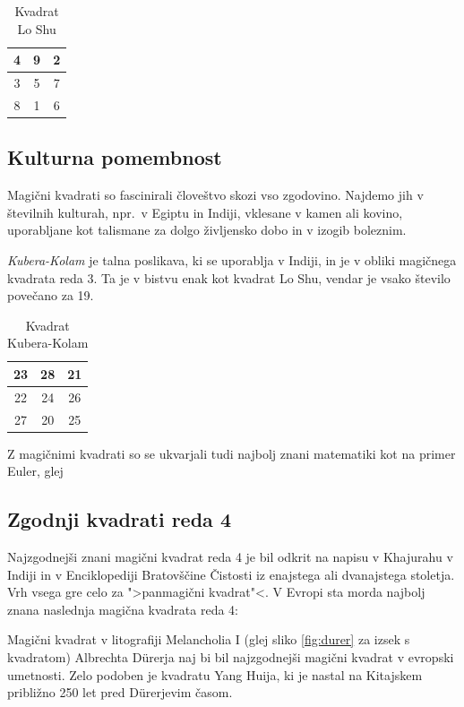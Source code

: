 \documentclass[a4paper,12pt]{article}
\newenvironment{magic}[3]{
   \begin{table}
      \centering
      \caption{#2}
      \label{#3}
      \Large
      \begin{tabular}{|*{#1}{c|}}\hline
}{
\end{tabular}
\end{table}
}
\begin{document}
 \begin{magic}{3}{Kvadrat Lo Shu}{table:loshu}
   4 & 9 & 2 \\\hline
   3 & 5 & 7 \\\hline
   8 & 1 & 6 \\\hline
 \end{magic}


\subsection{Kulturna pomembnost}

Magični kvadrati so fascinirali človeštvo skozi vso zgodovino. Najdemo jih
v številnih kulturah, npr.\ v Egiptu in Indiji, vklesane v kamen ali
kovino, uporabljane kot talismane za dolgo življensko dobo in v
izogib boleznim.

\emph{Kubera-Kolam} je talna poslikava, ki se uporablja v Indiji, in je v
obliki magičnega kvadrata reda 3. Ta je v bistvu enak kot kvadrat
Lo Shu, vendar je vsako število povečano za 19.

 \begin{magic}{3}{Kvadrat Kubera-Kolam}{kubera}
   23 & 28 & 21 \\\hline
   22 & 24 & 26 \\\hline
   27 & 20 & 25 \\\hline
 \end{magic}

Z magičnimi kvadrati so se ukvarjali tudi najbolj znani matematiki kot na
primer Euler, glej \cite{euler}


\subsection{Zgodnji kvadrati reda 4}

Najzgodnejši znani magični kvadrat reda 4 je bil odkrit na napisu
v Khajurahu v Indiji in v Enciklopediji Bratovščine Čistosti iz enajstega
ali dvanajstega stoletja. Vrh vsega gre celo za ">panmagični kvadrat"<.
V Evropi sta morda najbolj znana naslednja magična kvadrata reda 4:

Magični kvadrat v litografiji Melancholia I (glej sliko \ref{fig:durer}
za izsek s kvadratom) Albrechta Dürerja naj bi bil najzgodnejši magični kvadrat
v evropski umetnosti. Zelo podoben je kvadratu Yang Huija, ki je nastal na Kitajskem
približno 250 let pred Dürerjevim časom. %
\end{document}
